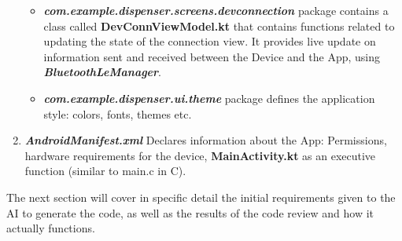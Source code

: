 \begin{enumerate}
\begin{itemize}
		\item \textit{\textbf{com.example.dispenser.screens.devconnection}} package contains a class called \textbf{DevConnViewModel.kt} that contains functions related to updating the state of the connection view. It provides live update on information sent and received between the Device and the App, using \textit{\textbf{\mbox{BluetoothLeManager}}}. 
		
		\item \textit{\textbf{com.example.dispenser.ui.theme}} package defines the application style: colors, fonts, themes etc.
	\end{itemize}
	\item \textit{\textbf{AndroidManifest.xml}} Declares information about the App: Permissions,  hardware requirements for the device, \textbf{MainActivity.kt} as an executive function (similar to main.c in C).
\end{enumerate}

The next section will cover in specific detail the initial requirements given to the AI to generate the code, as well as the results of the code review and how it actually functions.
